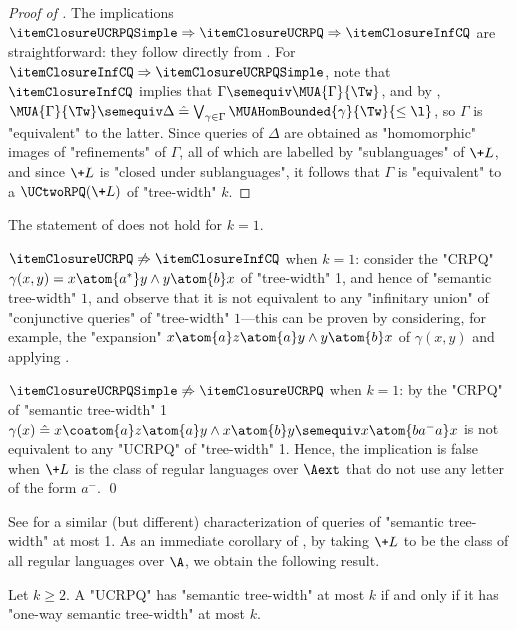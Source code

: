 \begin{proof}[Proof of ]
    The implications
	$\itemClosureUCRPQSimple \Rightarrow \itemClosureUCRPQ \Rightarrow \itemClosureInfCQ$
	are straightforward:
    they follow directly from .
    For $\itemClosureInfCQ \Rightarrow \itemClosureUCRPQSimple$, note that $\itemClosureInfCQ$ implies that
    $\Gamma \semequiv \MUA{\Gamma}{\Tw}$, and by
    ,
    $\MUA{\Gamma}{\Tw} \semequiv \Delta \defeq
    \bigvee_{\gamma \in \Gamma} \MUAHomBounded{\gamma}{\Tw}{\leq \l}$,
    so $\Gamma$ is "equivalent" to the latter.
    Since queries of $\Delta$ are obtained as "homomorphic" images
    of "refinements" of $\Gamma$, all of which are labelled by "sublanguages" of
    $\+L$, and since $\+L$ is "closed under sublanguages", it follows that
    $\Gamma$ is "equivalent" to a $\UCtwoRPQ(\+L)$ of "tree-width" $k$.
\end{proof}

\begin{remark}
    \AP\label{rk:closure-under-sublanguages-k1}
	The statement of  does not hold for $k=1$.

    $\itemClosureUCRPQ \not\Rightarrow \itemClosureInfCQ$ when $k=1$:
    consider the "CRPQ" $\gamma(x,y) = x \atom{a^*} y \land y \atom{b} x$ of "tree-width" 1,
    and hence of "semantic tree-width" $1$, and observe that it is not equivalent to any
    "infinitary union" of "conjunctive queries" of "tree-width" $1$---this can be proven
    by considering, for example, the "expansion"
    $x \atom{a} z \atom{a} y \land y \atom{b} x$ of $\gamma(x,y)$
    and applying .

    $\itemClosureUCRPQSimple \not\Rightarrow \itemClosureUCRPQ$ when $k=1$:
	by \cite[Proposition 6.4]{BarceloRomeroVardi2016SemanticAcyclicity} the "CRPQ"
    of "semantic tree-width" 1
    $\gamma(x) \defeq x \coatom{a} z \atom{a} y \land x \atom{b} y \semequiv x \atom{ba^- a} x$
    is not equivalent to any "UCRPQ" of "tree-width" 1. Hence, the implication is false when $\+L$ is the class of regular languages over $\Aext$
    that do not use any letter of the form $a^-$. \qed
\end{remark}

See  for a similar (but different) characterization
of queries of "semantic tree-width" at most 1.
As an immediate corollary of , by taking
$\+L$ to be the class of all regular languages over $\A$, we obtain the following result.
\begin{corollary}
	\AP\label{coro:collapse-twoway-oneway-semtw}
	Let $k \geq 2$. A "UCRPQ" has "semantic tree-width" at most $k$
	if and only if it has "one-way semantic tree-width" at most $k$.
\end{corollary}

